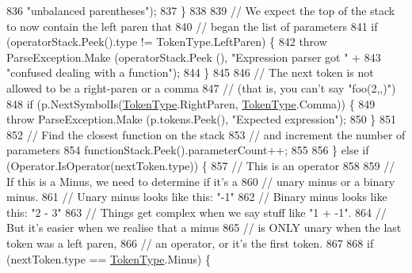 \begin{DoxyCode}
836                                 \textcolor{stringliteral}{"unbalanced parentheses"});
837                         \}
838 
839                         \textcolor{comment}{// We expect the top of the stack to now contain the left paren that}
840                         \textcolor{comment}{// began the list of parameters}
841                         \textcolor{keywordflow}{if} (operatorStack.Peek().type != TokenType.LeftParen) \{
842                             \textcolor{keywordflow}{throw} ParseException.Make (operatorStack.Peek (), \textcolor{stringliteral}{"Expression parser got "} +
843                                 \textcolor{stringliteral}{"confused dealing with a function"});
844                         \}
845 
846                         \textcolor{comment}{// The next token is not allowed to be a right-paren or a comma}
847                         \textcolor{comment}{// (that is, you can't say "foo(2,,)")}
848                         \textcolor{keywordflow}{if} (p.NextSymbolIs(\hyperlink{a00041_a301aa7c866593a5b625a8fc158bbeace}{TokenType}.RightParen, 
      \hyperlink{a00041_a301aa7c866593a5b625a8fc158bbeace}{TokenType}.Comma)) \{
849                             \textcolor{keywordflow}{throw} ParseException.Make (p.tokens.Peek(), \textcolor{stringliteral}{"Expected expression"});
850                         \}
851 
852                         \textcolor{comment}{// Find the closest function on the stack}
853                         \textcolor{comment}{// and increment the number of parameters}
854                         functionStack.Peek().parameterCount++;
855 
856                     \} \textcolor{keywordflow}{else} \textcolor{keywordflow}{if} (Operator.IsOperator(nextToken.type)) \{
857                         \textcolor{comment}{// This is an operator}
858 
859                         \textcolor{comment}{// If this is a Minus, we need to determine if it's a}
860                         \textcolor{comment}{// unary minus or a binary minus.}
861                         \textcolor{comment}{// Unary minus looks like this: "-1"}
862                         \textcolor{comment}{// Binary minus looks like this: "2 - 3"}
863                         \textcolor{comment}{// Things get complex when we say stuff like "1 + -1".}
864                         \textcolor{comment}{// But it's easier when we realise that a minus}
865                         \textcolor{comment}{// is ONLY unary when the last token was a left paren,}
866                         \textcolor{comment}{// an operator, or it's the first token.}
867 
868                         \textcolor{keywordflow}{if} (nextToken.type == \hyperlink{a00041_a301aa7c866593a5b625a8fc158bbeace}{TokenType}.Minus) \{

\end{DoxyCode}

